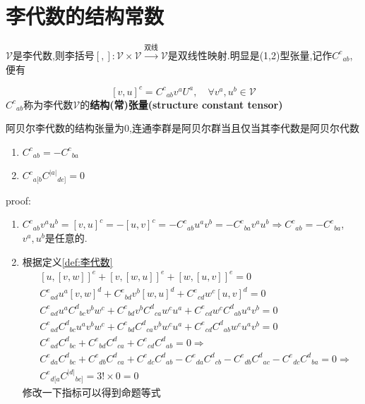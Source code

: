 \documentclass[../main.tex]{subfiles}
\begin{document}
 \chapter{李代数的结构常数}
 $\mathscr{V}$是李代数,则李括号$[,]:\mathscr{V}\times \mathscr{V} \xrightarrow{\text{双线}} \mathscr{V}$是双线性映射.明显是(1,2)型张量,记作$C^c{}_{ab}$,便有
 \begin{definition}
 $$[v,u]^c = C^c{}_{ab}v^aU^a,\quad \forall v^a,u^b \in \mathscr{V}$$
 $C^c{}_{ab}$称为李代数$\mathscr{V}$的\textbf{结构(常)张量(structure constant tensor)}
 \end{definition}
 \begin{note}
 阿贝尔李代数的结构张量为0,连通李群是阿贝尔群当且仅当其李代数是阿贝尔代数
 \end{note}
 \begin{theorem}
     \begin{enumerate}
         \item $C^{c}{}_{ab}=-C^{c}{}_{ba}$
         \item $C^{c}{}_{a[b}C^{|a|}{}_{de]} = 0$
     \end{enumerate}
 \end{theorem}
 proof:\begin{enumerate}
     \item $C^{c}{}_{ab}v^au^b = [v,u]^c = -[u,v]^c = -C^{c}{}_{ab}u^av^b = -C^{c}{}_{ba}v^au^b \Rightarrow C^{c}{}_{ab} = -C^{c}{}_{ba}$,$v^a,u^b$是任意的.
     \item 根据定义\ref{def:李代数}
     \begin{align*}
         &[u, [v, w]]^e + [v, [w, u]]^e + [w, [u, v]]^e = 0\\
         &C^e{}_{ad}u^a[v,w]^d + C^e{}_{bd}v^b[w,u]^d + C^e{}_{cd}w^c[u,v]^d =0\\
         &C^e{}_{ad}u^aC^d{}_{bc}v^bw^c + C^e{}_{bd}v^bC^d{}_{ca}w^cu^a + C^e{}_{cd}w^cC^d{}_{ab}u^av^b =0\\
         &C^e{}_{ad}C^d{}_{bc}u^av^bw^c + C^e{}_{bd}C^d{}_{ca}v^bw^cu^a + C^e{}_{cd}C^d{}_{ab}w^cu^av^b =0\\
         &C^e{}_{ad}C^d{}_{bc} + C^e{}_{bd}C^d{}_{ca} + C^e{}_{cd}C^d{}_{ab} =0\Rightarrow\\
         &C^e{}_{da}C^d{}_{bc} + C^e{}_{db}C^d{}_{ca} + C^e{}_{dc}C^d{}_{ab} -C^e{}_{da}C^d{}_{cb} - C^e{}_{db}C^d{}_{ac} - C^e{}_{dc}C^d{}_{ba} =0 \Rightarrow\\
         &C^e{}_{d[a}C^{|d|}{}_{bc]} = 3!\times0 = 0
     \end{align*}
     修改一下指标可以得到命题等式
 \end{enumerate}
\end{document}
